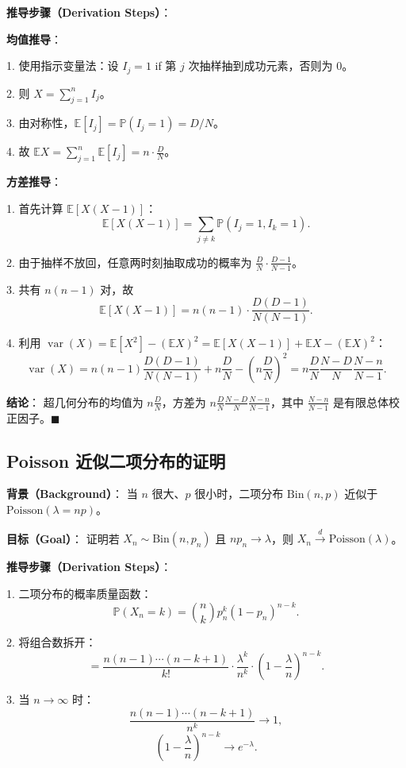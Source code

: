 \textbf{推导步骤（Derivation Steps）}：

\textbf{均值推导}：

1. 使用指示变量法：设 $I_j = 1$ if 第 $j$ 次抽样抽到成功元素，否则为 0。

2. 则 $X = \sum_{j=1}^n I_j$。

3. 由对称性，$\mathbb{E}[I_j] = \mathbb{P}(I_j = 1) = D/N$。

4. 故 $\mathbb{E}X = \sum_{j=1}^n \mathbb{E}[I_j] = n \cdot \frac{D}{N}$。

\textbf{方差推导}：

1. 首先计算 $\mathbb{E}[X(X-1)]$：
\[
\mathbb{E}[X(X-1)] = \sum_{j \neq k} \mathbb{P}(I_j = 1, I_k = 1).
\]

2. 由于抽样不放回，任意两时刻抽取成功的概率为 $\frac{D}{N} \cdot \frac{D-1}{N-1}$。

3. 共有 $n(n-1)$ 对，故
\[
\mathbb{E}[X(X-1)] = n(n-1) \cdot \frac{D(D-1)}{N(N-1)}.
\]

4. 利用 $\operatorname{var}(X) = \mathbb{E}[X^2] - (\mathbb{E}X)^2 = \mathbb{E}[X(X-1)] + \mathbb{E}X - (\mathbb{E}X)^2$：
\[
\operatorname{var}(X) = n(n-1)\frac{D(D-1)}{N(N-1)} + n\frac{D}{N} - \left(n\frac{D}{N}\right)^2
= n\frac{D}{N}\frac{N-D}{N}\frac{N-n}{N-1}.
\]

\textbf{结论}：
超几何分布的均值为 $n\frac{D}{N}$，方差为 $n\frac{D}{N}\frac{N-D}{N}\frac{N-n}{N-1}$，其中 $\frac{N-n}{N-1}$ 是有限总体校正因子。$\blacksquare$

\subsection{Poisson 近似二项分布的证明}\label{sec:poisson-approximation-proof}

\textbf{背景（Background）}：
当 $n$ 很大、$p$ 很小时，二项分布 $\text{Bin}(n, p)$ 近似于 $\text{Poisson}(\lambda = np)$。

\textbf{目标（Goal）}：
证明若 $X_n \sim \text{Bin}(n, p_n)$ 且 $np_n \to \lambda$，则 $X_n \xrightarrow{d} \text{Poisson}(\lambda)$。

\textbf{推导步骤（Derivation Steps）}：

1. 二项分布的概率质量函数：
\[
\mathbb{P}(X_n = k) = \binom{n}{k} p_n^k (1-p_n)^{n-k}.
\]

2. 将组合数拆开：
\[
= \frac{n(n-1)\cdots(n-k+1)}{k!} \cdot \frac{\lambda^k}{n^k} \cdot \left(1 - \frac{\lambda}{n}\right)^{n-k}.
\]

3. 当 $n \to \infty$ 时：
\[
\frac{n(n-1)\cdots(n-k+1)}{n^k} \to 1,
\]
\[
\left(1 - \frac{\lambda}{n}\right)^{n-k} \to e^{-\lambda}.
\]

